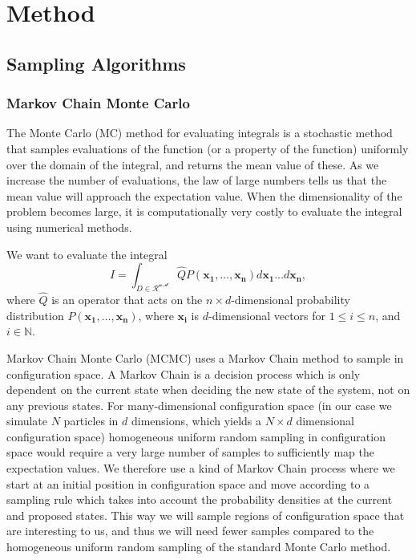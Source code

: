 \section{Method}\label{sec:Method}

\subsection{Sampling Algorithms}\label{sec:sampling_algos}

\subsubsection{Markov Chain Monte Carlo}

The Monte Carlo (MC) method for evaluating integrals is a stochastic method that samples evaluations of the function (or a property of the function) uniformly over the domain of the integral, and returns the mean value of these. As we increase the number of evaluations, the law of large numbers tells us that the mean value will approach the expectation value. When the dimensionality of the problem becomes large, it is computationally very costly to evaluate the integral using numerical methods.

We want to evaluate the integral 
\begin{equation}
    I = \int_{D\in\mathcal{R^{n, d}}}\hat{Q}P(\mathbf{x_1}, \dots, \mathbf{x_n})d\mathbf{x_1}\dots d\mathbf{x_n},
\end{equation}
where $\hat{Q}$ is an operator that acts on the $n\times d$-dimensional probability distribution $P(\mathbf{x_1}, \dots, \mathbf{x_n})$, where $\mathbf{x_i}$ is $d$-dimensional vectors for $1\leq i\leq n$, and $i\in\mathbb{N}$. 


Markov Chain Monte Carlo (MCMC) uses a Markov Chain method to sample in configuration space. A Markov Chain is a decision process which is only dependent on the current state when deciding the new state of the system, not on any previous states. For many-dimensional configuration space (in our case we simulate $N$ particles in $d$ dimensions, which yields a $N\times d$ dimensional configuration space) homogeneous uniform random sampling in configuration space would require a very large number of samples to sufficiently map the expectation values. We therefore use a kind of Markov Chain process where we start at an initial position in configuration space and move according to a sampling rule which takes into account the probability densities at the current and proposed states. This way we will sample regions of configuration space that are interesting to us, and thus we will need fewer samples compared to the homogeneous uniform random sampling of the standard Monte Carlo method. 


